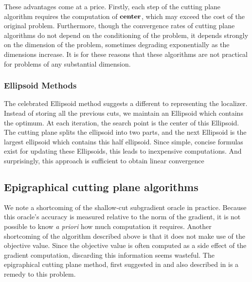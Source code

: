 These advantages come at a price. Firstly, each step of the cutting
plane algorithm requires the computation of ${\bf center}$, which may
exceed the cost of the original problem. Furthermore, though the
convergence rates of cutting plane algorithms do not depend on the
conditioning of the problem, it depends strongly on the dimension of
the problem, sometimes degrading exponentially as the dimensions
increase. It is for these reasons that these algorithms are not
practical for problems of any substantial dimension.


\subsubsection{Ellipsoid Methods}

The celebrated Ellipsoid method \cite{bland1981ellipsoid} suggests
a different to representing the localizer. Instead of storing all the previous
cuts, we maintain an  Ellipsoid which contains the optimum. At each iteration,
the search point is the center of this Ellipsoid. The cutting plane splits the
ellipsoid into two parts, and the next Ellipsoid is the largest ellipsoid
which contains this half ellipsoid.  Since simple, concise formulas exist for
updating these Ellipsoids,  this leads to inexpensive computations. And
surprisingly, this approach is sufficient to obtain linear convergence


\subsection{Epigraphical cutting plane algorithms}

We note a shortcoming of the shallow-cut subgradient oracle in
practice. Because this oracle's accuracy is measured relative to the
norm of the gradient, it is not possible to know \emph{a priori} how
much computation it requires. Another shortcoming of the algorithm
described above is that it does not make use of the objective value.
Since the objective value is often computed as a side effect of the
gradient computation, discarding this information seems wasteful. The
epigraphical cutting plane method, first suggested in
\cite{bahn1994experimental} and also described in
\cite{boyd2007localization,goffin1999two,mehrotra2000volumetric} is a
remedy to this problem. 

